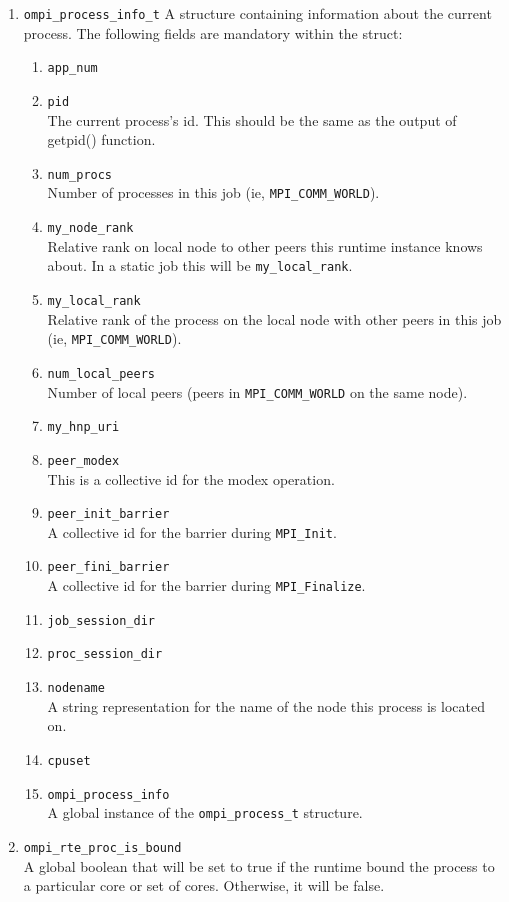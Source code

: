 \begin{enumerate}
\item \verb|ompi_process_info_t|
  A structure containing information about the current process. The following fields are mandatory within the struct:
  \begin{enumerate}
  \item \verb|app_num|
  \item \verb|pid|\\
    The current process's id. This should be the same as the output of getpid() function.
  \item \verb|num_procs|\\
    Number of processes in this job (ie, \verb|MPI_COMM_WORLD|).
  \item \verb|my_node_rank|\\
    Relative rank on local node to other peers this runtime instance knows about. In a static job this will be \verb|my_local_rank|.
  \item \verb|my_local_rank|\\
    Relative rank of the process on the local node with other peers in this job (ie, \verb|MPI_COMM_WORLD|).
  \item \verb|num_local_peers|\\
    Number of local peers (peers in \verb|MPI_COMM_WORLD| on the same node).
  \item \verb|my_hnp_uri|
  \item \verb|peer_modex| \\
    This is a collective id for the modex operation.
  \item \verb|peer_init_barrier| \\
    A collective id for the barrier during \verb|MPI_Init|.
  \item \verb|peer_fini_barrier| \\
    A collective id for the barrier during \verb|MPI_Finalize|.
  \item \verb|job_session_dir|
  \item \verb|proc_session_dir|
  \item \verb|nodename| \\
    A string representation for the name of the node this process is located on.
  \item \verb|cpuset|
  \item \verb|ompi_process_info| \\
    A global instance of the \verb|ompi_process_t| structure.
  \end{enumerate}
  
\item \verb|ompi_rte_proc_is_bound|\\
  A global boolean that will be set to true if the runtime bound the process to a particular core or set of cores. Otherwise, it will be false.
\end{enumerate}


